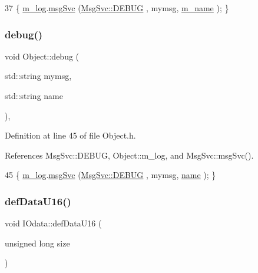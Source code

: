 \begin{DoxyCode}
37 \{ \hyperlink{classObject_a0d269813dd7ac1f24bc143031e2963f2}{m\_log}.\hyperlink{classMsgSvc_ad25f18047920cc59a314e5098259711c}{msgSvc} (\hyperlink{classMsgSvc_ae671eb7301996cd049d2da8a65925926a1dbdcc82dce88370ec335883c83b38b0}{MsgSvc::DEBUG}   , mymsg, \hyperlink{classObject_a8b83c95c705d2c3ba0d081fe1710f48d}{m\_name} ); \}
\end{DoxyCode}
\mbox{\label{classObject_a6c9a0397ca804e04d675ed05683f5420}} 
\subsubsection{\texorpdfstring{debug()}{debug()}\hspace{0.1cm}{\footnotesize\ttfamily [2/2]}}
{\footnotesize\ttfamily void Object\+::debug (\begin{DoxyParamCaption}\item[{std\+::string}]{mymsg,  }\item[{std\+::string}]{name }\end{DoxyParamCaption})\hspace{0.3cm}{\ttfamily [inline]}, {\ttfamily [inherited]}}



Definition at line 45 of file Object.\+h.



References Msg\+Svc\+::\+D\+E\+B\+UG, Object\+::m\+\_\+log, and Msg\+Svc\+::msg\+Svc().


\begin{DoxyCode}
45 \{ \hyperlink{classObject_a0d269813dd7ac1f24bc143031e2963f2}{m\_log}.\hyperlink{classMsgSvc_ad25f18047920cc59a314e5098259711c}{msgSvc} (\hyperlink{classMsgSvc_ae671eb7301996cd049d2da8a65925926a1dbdcc82dce88370ec335883c83b38b0}{MsgSvc::DEBUG}   , mymsg, \hyperlink{classObject_a300f4c05dd468c7bb8b3c968868443c1}{name} ); \}
\end{DoxyCode}
\mbox{\label{classIOdata_a9e37c736d6dfb5223ed45786fad403da}} 
\subsubsection{\texorpdfstring{def\+Data\+U16()}{defDataU16()}}
{\footnotesize\ttfamily void I\+Odata\+::def\+Data\+U16 (\begin{DoxyParamCaption}\item[{unsigned long}]{size }\end{DoxyParamCaption})\hspace{0.3cm}{\ttfamily [inline]}}



